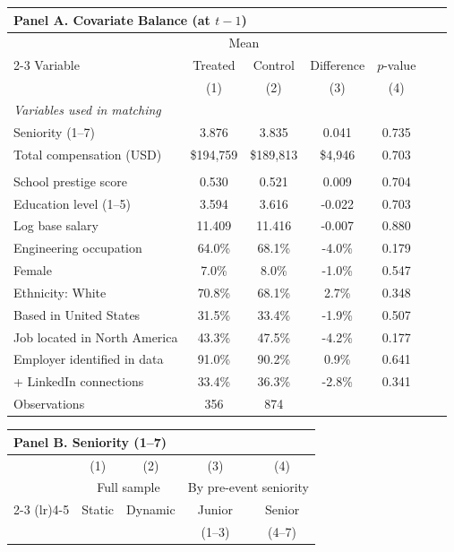 \begin{center}
\begin{table}
\begin{tabular}{lcccccc}
\multicolumn{5}{l}{\textbf{Panel A. Covariate Balance (at $t-1$)}} \\[2pt]
\toprule
 & \multicolumn{2}{c}{Mean} & & & & \\
\cmidrule(lr){2-3}
Variable & Treated & Control & Difference  & $p$-value \\
 & (1) & (2) & (3) & (4) \\
\midrule
\multicolumn{7}{l}{\textit{Variables used in matching}} \\
\quad Seniority (1--7) & 3.876 & 3.835 & 0.041 &  0.735 \\
\quad Total compensation (USD) & \$194,759 & \$189,813 & \$4,946 &  0.703 \\
\addlinespace
\multicolumn{7}{l}{\textit{Variables not used in matching}} \\
\quad School prestige score & 0.530 & 0.521 & 0.009 &  0.704 \\
\quad Education level (1--5) & 3.594 & 3.616 & -0.022 &  0.703 \\
\quad Log base salary & 11.409 & 11.416 & -0.007 &  0.880 \\
\quad Engineering occupation & 64.0\% & 68.1\% & -4.0\% &  0.179 \\
\quad Female & 7.0\% & 8.0\% & -1.0\% &  0.547 \\
\quad Ethnicity: White & 70.8\% & 68.1\% & 2.7\% &  0.348 \\
\quad Based in United States & 31.5\% & 33.4\% & -1.9\% &  0.507 \\
\quad Job located in North America & 43.3\% & 47.5\% & -4.2\% &  0.177 \\
\quad Employer identified in data & 91.0\% & 90.2\% & 0.9\% &  0.641 \\
\quad 500+ LinkedIn connections & 33.4\% & 36.3\% & -2.8\% &  0.341 \\
\midrule
Observations & 356 & 874 & &  \\
\bottomrule
\end{tabular}
\vspace{10pt}
\begin{tabular}{lcccc}
\multicolumn{5}{l}{\textbf{Panel B. Seniority (1--7)}} \\[2pt]
\toprule
 & (1) & (2) & (3) & (4) \\
 & \multicolumn{2}{c}{Full sample} & \multicolumn{2}{c}{By pre-event seniority} \\
\cmidrule(lr){2-3} \cmidrule(lr){4-5}
 & Static & Dynamic & Junior & Senior \\
 & & & \small(1--3) & \small(4--7) \\

\end{tabular}
\end{table}
\end{center}
